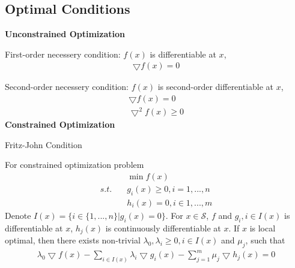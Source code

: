 \documentclass[runningheads]{llncs}
\begin{document}
\subsection{Optimal Conditions}
\par\noindent
\textbf{Unconstrained Optimization}
\par
First-order necessery condition:
$f(x)$ is differentiable at $x$, 
\begin{align}
    \bigtriangledown f(x) = 0
\end{align}
\par
Second-order necessery condition:
$f(x)$ is second-order differentiable at $x$,
\begin{align}
    \bigtriangledown f(x) = 0 \\
    \bigtriangledown^2 f(x) \geq 0
\end{align}
\noindent
\textbf{Constrained Optimization}


\begin{theorem}{Fritz-John Condition}
    \par
    For constrained optimization problem
    \begin{align}
        & \min f(x) \\
        s.t.\quad & g_i(x) \geq 0, i = 1,..., n \\
        & h_i(x) = 0, i \in 1, ..., m
    \end{align}
    Denote $I(x) = \{i \in \{1,...,n\} | g_i(x) = 0\}$.
    For $x \in \mathcal{S}$, $f$ and $g_i, i \in I(x)$
    is differentiable at $x$, $h_j(x)$ is continuously
    differentiable at $x$.
    If $x$ is local optimal, then there exists non-trivial
    $\lambda_0, \lambda_i \geq 0, i \in I(x)$
    and $\mu_j$, such that
    \begin{align}
        \lambda_0 \bigtriangledown f(x) - \sum_{i \in I(x)} \lambda_i
        \bigtriangledown g_i(x) - \sum_{j=1}^m \mu_j
        \bigtriangledown h_j(x) = 0
    \end{align}
\end{theorem}
\end{document}
